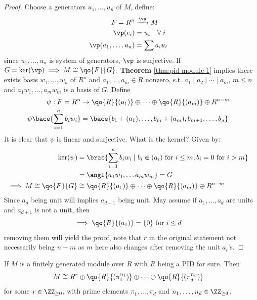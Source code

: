 \begin{proof}
	Choose a generators \( u_1,\ldots, u_n \) of \( M \), define:
	\[
		\begin{aligned}
			F = R^n             & \xrightarrow{\vp} M      \\
			\vp(e_i)            & = u_i \quad \forall \; i \\
			\vp(a_1,\ldots,a_n) & = \sum a_i u_i
		\end{aligned}
	\]
	since \( u_1,\ldots,u_n \) is system of generators, \( \vp \) is surjective. If \( G = \ker(\vp) \implies
	M \cong \qo{F}{G} \). \textbf{Theorem} \ref{thm:pid-module-1} implies there
	exists basis \( w_1,\ldots,w_n \) of \( R^n \) and \( a_1,\ldots, a_m \in R \) nonzero, s.t. \(
	a_1\mid a_2 \mid \cdots \mid a_m \), \( m \leq n \) and \( a_1 w_1,\ldots, a_m w_m \) is a basis
	of \( G \). Define
	\[
		\begin{aligned}
			\psi: F = R^n                    & \rightarrow \qo{R}{(a_1)} \oplus \cdots \oplus \qo{R}{(a_m)} \oplus R^{n-m} \\
			\psi \bace{\sum_{i=1}^n b_i w_i} & = \bace{b_1+(a_1), \ldots, b_m +(a_m), b_{m+1}, \ldots, b_n}
		\end{aligned}
	\]
	It is clear that \( \psi \) is linear and surjective. What is the kernel? Given by:
	\[
		\begin{aligned}
			\ker(\psi)                 & = \brac{\sum_{i=1}^n b_i w_i \; | \; b_i \in (a_i) \text{ for } i \leq m, b_i = 0
			\text{ for } i >m}                                                                                             \\
			                           & = \angl{a_1 w_1,\ldots a_m w_m} = G                                               \\
			\implies M \cong \qo{F}{G} & \cong \qo{R}{(a_1)} \oplus \cdots \oplus \qo{R}{(a_m)} \oplus
			R^{n-m}
		\end{aligned}
	\]
	Since \( a_d \) being unit will implies \( a_{d-1} \) being unit. May assume if \( a_1,\ldots, a_d \)
	are units and \( a_{d+1} \) is not a unit, then
	\[
		\implies \qo{R}{(a_1)} = \{0\} \text{ for } i \leq d
	\]
	removing them will yield the proof, note that \( r \) in the original statement not necessarily
	being \( n-m \) as \( m \) here also changes after removing the unit \( a_i \)'s.
\end{proof}

\begin{corollary}
	\label{cor:pid-module-1}
	If \( M \) is a finitely generated module over \( R \) with \( R \) being a PID for sure. Then
	\[
		M \cong R^r \oplus \qo{R}{(\pi^{n_1}_1)} \oplus \cdots \oplus \qo{R}{(\pi^{n_d}_d)}
	\]
	for some \( r\in \ZZ_{\geq 0} \), with prime elements \( \pi_1,\ldots,\pi_d \) and \(
	n_1,\ldots,n_d \in \ZZ_{\geq 0} \).
\end{corollary}

